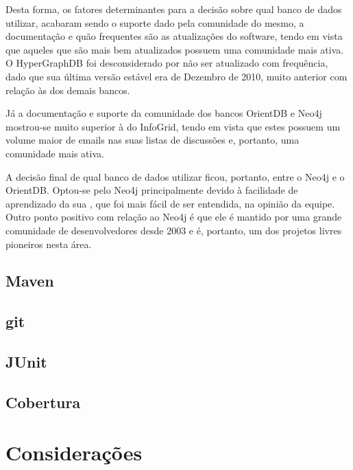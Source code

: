 Desta forma, os fatores determinantes para a decisão sobre qual banco de dados utilizar, acabaram sendo o suporte dado pela comunidade do mesmo, a documentação e quão frequentes são as atualizações do software, tendo em vista que aqueles que são mais bem atualizados possuem uma comunidade mais ativa.
O HyperGraphDB foi desconsiderado por não ser atualizado com frequência, dado que sua última versão estável era de Dezembro de 2010, muito anterior com relação às dos demais bancos.

Já a documentação e suporte da comunidade dos bancos OrientDB e Neo4j mostrou-se muito superior à do InfoGrid, tendo em vista que estes possuem um volume maior de emails nas suas listas de discussões e, portanto, uma comunidade mais ativa.

A decisão final de qual banco de dados utilizar ficou, portanto, entre o Neo4j e o OrientDB.
Optou-se pelo Neo4j principalmente devido à facilidade de aprendizado da sua , que foi mais fácil de ser entendida, na opinião da equipe.
Outro ponto positivo com relação ao Neo4j é que ele é mantido por uma grande comunidade de desenvolvedores desde 2003 e é, portanto, um dos projetos livres pioneiros nesta área.

\subsection{Maven}

\subsection{git}

\subsection{JUnit}

\subsection{Cobertura}

\section{Considerações}

